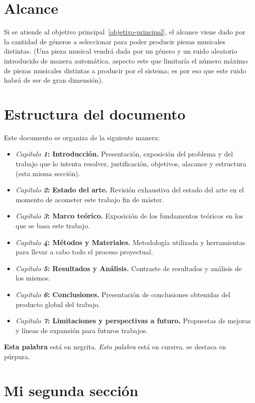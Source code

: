 \section{Alcance}
Si se atiende al objetivo principal~\ref{objetivo-principal}, el alcance viene dado por la cantidad de géneros a seleccionar para poder producir piezas musicales distintas. (Una pieza musical vendrá dada por un género y un ruido aleatorio introducido de manera automática, aspecto este que limitaría el número máximo de piezas musicales distintas a producir por el sistema; es por eso que este ruido habrá de ser de gran dimensión).

\section{Estructura del documento}
Este documento se organiza de la siguiente manera:
\begin{itemize}
    \item \emph{Capítulo \textbf{1}}\textbf{: Introducción.} Presentación, exposición del problema y del trabajo que lo intenta resolver, justificación, objetivos, alacance y estructura (esta misma sección).
    \item \emph{Capítulo \textbf{2}}\textbf{: Estado del arte.} Revisión exhaustiva del estado del arte en el momento de acometer este trabajo fin de máster.
    \item \emph{Capítulo \textbf{3}}\textbf{: Marco teórico.} Exposición de los fundamentos teóricos en los que se basa este trabajo.
    \item \emph{Capítulo \textbf{4}}\textbf{: Métodos y Materiales.} Metodología utilizada y herramientas para llevar a cabo todo el proceso proyectual.
    \item \emph{Capítulo \textbf{5}}\textbf{: Resultados y Análisis.} Contraste de resultados y análisis de los mismos.
    \item \emph{Capítulo \textbf{6}}\textbf{: Conclusiones.} Presentación de conclusiones obtenidas del producto global del trabajo.
    \item \emph{Capítulo \textbf{7}}\textbf{: Limitaciones y perspectivas a futuro.} Propuestas de mejoras y líneas de expansión para futuros trabajos.
\end{itemize}

\textbf{Esta palabra} está en negrita. \textit{Esta palabra} está en cursiva.  se destaca en púrpura.
\medskip

\section{Mi segunda sección}
\label{mi-segunda-seccion}

